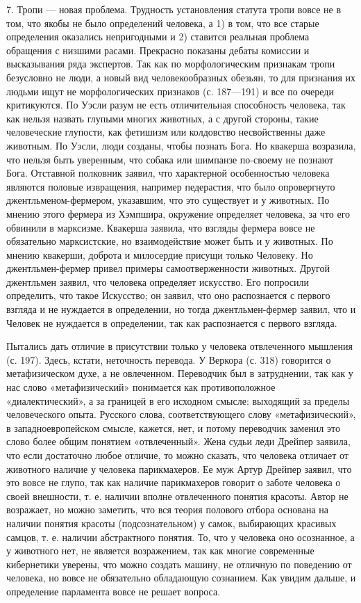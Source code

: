 7. Тропи — новая проблема. Трудность установления статута тропи вовсе не в том, что якобы не было определений человека, а 1) в том, что все старые определения оказались непригодными и 2) ставится реальная проблема обращения с низшими расами. Прекрасно показаны дебаты комиссии и высказывания ряда экспертов. Так как по морфологическим признакам тропи безусловно не люди, а новый вид человекообразных обезьян, то для признания их людьми ищут не морфологических признаков (с. 187—191) и все по очереди критикуются. По Уэсли разум не есть отличительная способность человека, так как нельзя назвать глупыми многих животных, а с другой стороны, такие человеческие глупости, как фетишизм или колдовство несвойственны даже животным. По Уэсли, люди созданы, чтобы познать Бога. Но квакерша возразила, что нельзя быть уверенным, что собака или шимпанзе по-своему не познают Бога. Отставной полковник заявил, что характерной особенностью человека являются половые извращения, например педерастия, что было опровергнуто джентльменом-фермером, указавшим, что это существует и у животных. По мнению этого фермера из Хэмпшира, окружение определяет человека, за что его обвинили в марксизме. Квакерша заявила, что взгляды фермера вовсе не обязательно марксистские, но взаимодействие может быть и у животных. По мнению квакерши, доброта и милосердие присущи только Человеку. Но джентльмен-фермер привел примеры самоотверженности животных. Другой джентльмен заявил, что человека определяет искусство. Его попросили определить, что такое Искусство; он заявил, что оно распознается с первого взгляда и не нуждается в определении, но тогда джентльмен-фермер заявил, что и Человек не нуждается в определении, так как распознается с первого взгляда.

Пытались дать отличие в присутствии только у человека отвлеченного мышления (с. 197). Здесь, кстати, неточность перевода. У Веркора (с. 318) говорится о метафизическом духе, а не овлеченном. Переводчик был в затруднении, так как у нас слово «метафизический» понимается как противоположное «диалектический», а за границей в его исходном смысле: выходящий за пределы человеческого опыта. Русского слова, соответствующего слову «метафизический», в западноевропейском смысле, кажется, нет, и потому переводчик заменил это слово более общим понятием «отвлеченный». Жена судьи леди Дрейпер заявила, что если достаточно любое отличие, то можно сказать, что человека отличает от животного наличие у человека парикмахеров. Ее муж Артур Дрейпер заявил, что это вовсе не глупо, так как наличие парикмахеров говорит о заботе человека о своей внешности, т. е. наличии вполне отвлеченного понятия красоты. Автор не возражает, но можно заметить, что вся теория полового отбора основана на наличии понятия красоты (подсознательном) у самок, выбирающих красивых самцов, т. е. наличии абстрактного понятия. То, что у человека оно осознанное, а у животного нет, не является возражением, так как многие современные кибернетики уверены, что можно создать машину, не отличную по поведению от человека, но вовсе не обязательно обладающую сознанием. Как увидим дальше, и определение парламента вовсе не решает вопроса.

